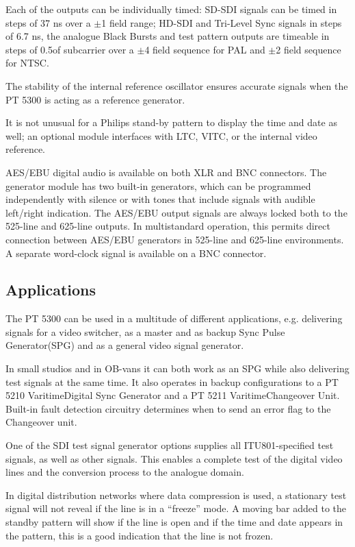 Each of the outputs can be individually timed: SD-SDI signals can be timed in steps of 37 ns over a ${\pm}$1 field range; HD-SDI and Tri-Level Sync signals in steps of 6.7 ns, the analogue Black Bursts and test pattern outputs are timeable in steps of 0.5\degrees of subcarrier over a ${\pm}$4 field sequence for PAL and ${\pm}$2 field sequence for NTSC.

The stability of the internal reference oscillator ensures accurate signals when the PT 5300 is acting as a reference generator.

It is not unusual for a Philips stand-by pattern to display the time and date as well; an optional module interfaces with LTC, VITC, or the internal video reference.

AES/EBU digital audio is available on both XLR and BNC connectors. The generator module has two built-in generators, which can be programmed independently with silence or with tones that include signals with audible left/right indication. The AES/EBU output signals are always locked both to the 525-line and 625-line outputs. In multistandard operation, this permits direct connection between AES/EBU generators in 525-line and 625-line environments. A separate word-clock signal is available on a BNC connector.

\subsection{Applications}
The PT 5300 can be used in a multitude of different applications, e.g. delivering signals for a video switcher, as a master and as backup Sync Pulse Generator(SPG) and as a general video signal generator. 

In small studios and in OB-vans it can both work as an SPG while also delivering test signals at the same time. It also operates in backup configurations to a PT 5210 Varitime\TM Digital Sync Generator and a PT 5211 Varitime\TM Changeover Unit. Built-in fault detection circuitry determines when to send an error flag to the Changeover unit.

One of the SDI test signal generator options supplies all ITU801-specified test signals, as well as other signals. This enables a complete test of the digital video lines and the conversion process to the analogue domain.

In digital distribution networks where data compression is used, a stationary test signal will not reveal if the line is in a ``freeze'' mode. A moving bar added to the standby pattern will show if the line is open and if the time and date appears in the pattern, this is a good indication that the line is not frozen.

